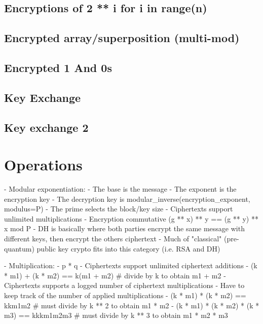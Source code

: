 \documentclass[preprint]{iacrtrans}
\begin{document}
\subsection{Encryptions of 2 ** i for i in range(n)}
\subsection{Encrypted array/superposition (multi-mod)}
\subsection{Encrypted 1 And 0s} %
\subsection{Key Exchange} %
\subsection{Key exchange 2} %

\section{Operations}

- Modular exponentiation:
    - The base is the message
    - The exponent is the encryption key
         - The decryption key is modular_inverse(encryption_exponent, modulus=P)
    - The prime selects the block/key size
    - Ciphertexts support unlimited multiplications
    - Encryption commutative (g ** x) ** y == (g ** y) ** x mod P
        - DH is basically where both parties encrypt the same message with different keys, then encrypt the others ciphertext
    - Much of "classical" (pre-quantum) public key crypto fits into this category (i.e. RSA and DH)
    
- Multiplication:
    - p * q    
    - Ciphertexts support unlimited ciphertext additions
        - (k * m1) + (k * m2) == k(m1 + m2)               # divide by k to obtain m1 + m2            
    - Ciphertexts supports a logged number of ciphertext multiplications
        - Have to keep track of the number of applied multiplications
            - (k * m1) * (k * m2) == kkm1m2               # must divide by k ** 2 to obtain m1 * m2
            - (k * m1) * (k * m2) * (k * m3) == kkkm1m2m3 # must divide by k ** 3 to obtain m1 * m2 * m3
            
\end{document}
